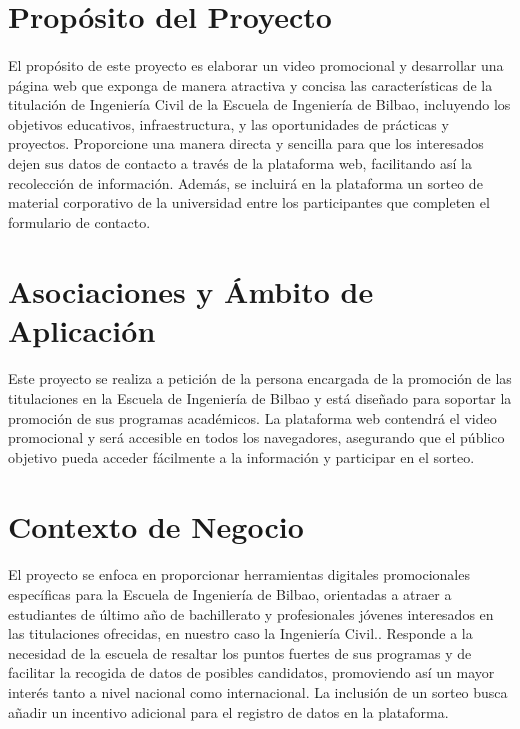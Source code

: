\documentclass{report}
\begin{document}
        \section{Propósito del Proyecto}
            \paragraph*{}
            El propósito de este proyecto es elaborar un video promocional y desarrollar una página web que exponga de manera atractiva y concisa las características de la titulación de Ingeniería Civil de la Escuela de Ingeniería de Bilbao, incluyendo los objetivos educativos, infraestructura, y las oportunidades de prácticas y proyectos. Proporcione una manera directa y sencilla para que los interesados dejen sus datos de contacto a través de la plataforma web, facilitando así la recolección de información. Además, se incluirá en la plataforma un sorteo de material corporativo de la universidad entre los participantes que completen el formulario de contacto.
        \section{Asociaciones y Ámbito de Aplicación}
            \paragraph*{}
            Este proyecto se realiza a petición de la persona encargada de la promoción de las titulaciones en la Escuela de Ingeniería de Bilbao y está diseñado para soportar la promoción de sus programas académicos. La plataforma web contendrá el video promocional y será accesible en todos los navegadores, asegurando que el público objetivo pueda acceder fácilmente a la información y participar en el sorteo.
        \section{Contexto de Negocio}
            \paragraph*{}
            El proyecto se enfoca en proporcionar herramientas digitales promocionales específicas para la Escuela de Ingeniería de Bilbao, orientadas a atraer a estudiantes de último año de bachillerato y profesionales jóvenes interesados en las titulaciones ofrecidas, en nuestro caso la Ingeniería Civil.. Responde a la necesidad de la escuela de resaltar los puntos fuertes de sus programas y de facilitar la recogida de datos de posibles candidatos, promoviendo así un mayor interés tanto a nivel nacional como internacional. La inclusión de un sorteo busca añadir un incentivo adicional para el registro de datos en la plataforma.
\end{document}
